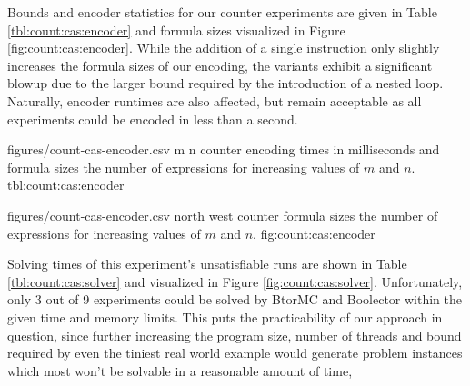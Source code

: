 \newpage

Bounds and encoder statistics for our  counter experiments are given in Table \ref{tbl:count:cas:encoder} and formula sizes visualized in Figure \ref{fig:count:cas:encoder}.
While the addition of a single instruction only slightly increases the formula sizes of our {\BTOR} encoding, the {\SMTLIB} variants exhibit a significant blowup due to the larger bound required by the introduction of a nested loop.
Naturally, encoder runtimes are also affected, but remain acceptable as all experiments could be encoded in less than a second.

\bigbreak

\EncoderStatsTable
  {figures/count-cas-encoder.csv}
  {m n}
  {\CountRowHeader}
  { counter encoding times in milliseconds and formula sizes  the number of expressions for increasing values of $m$ and $n$.}
  {tbl:count:cas:encoder}

\EncoderStatsGraph
  {figures/count-cas-encoder.csv}
  {north west}
  { counter formula sizes  the number of expressions for increasing values of $m$ and $n$.}
  {fig:count:cas:encoder}

\newpage

Solving times of this experiment's unsatisfiable runs are shown in Table \ref{tbl:count:cas:solver} and visualized in Figure \ref{fig:count:cas:solver}.
Unfortunately, only 3 out of 9 experiments could be solved by BtorMC and Boolector within the given time and memory limits.
This puts the practicability of our approach in question, since further increasing the program size, number of threads and bound required by even the tiniest real world example
would generate problem instances which most  won't be solvable in a reasonable amount of time,

